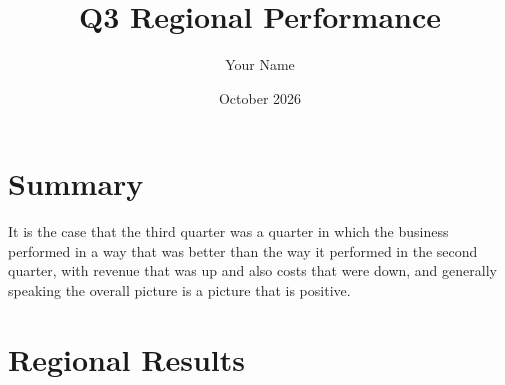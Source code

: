 \documentclass[11pt,a4paper]{article}
\title{Q3 Regional Performance}
\author{Your Name}
\date{October 2026}
\begin{document}
\maketitle

\section{Summary}
\label{sec:summary}

%
%
%
%
%
%
%
%

It is the case that the third quarter was a quarter in
which the business performed in a way that was better
than the way it performed in the second quarter, with
revenue that was up and also costs that were down, and
generally speaking the overall picture is a picture
that is positive.

%
%
%
%
%
%
%
%
%
%

\section{Regional Results}
\label{sec:regions}
\end{document}
